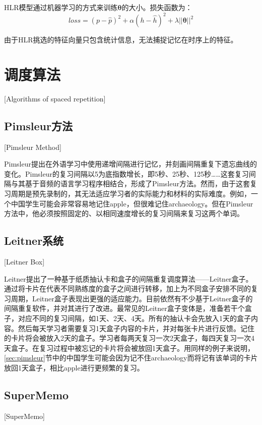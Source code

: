 HLR模型通过机器学习的方式来训练$\bm \theta$的大小。损失函数为：
\begin{equation}
\label{eqn:hlr:loss}
loss=(p-\hat p)^2 + \alpha(h-\hat h)^2 + \lambda||\bm\theta||^2
\end{equation}

由于HLR挑选的特征向量只包含统计信息，无法捕捉记忆在时序上的特征。

\section{调度算法}[Algorithms of spaced repetition]

\subsection{Pimsleur方法}[Pimsleur Method]\label{sec:pimsleur}

Pimsleur提出在外语学习中使用递增间隔进行记忆，并刻画间隔重复下遗忘曲线的变化\cite{pimsleurMemorySchedule1967}。Pimsleur的复习间隔以5为底指数增长，即5秒、25秒、125秒……这套复习间隔与其基于音频的语言学习程序相结合，形成了Pimsleur方法。然而，由于这套复习周期是预先录制的，其无法适应学习者的实际能力和材料的实际难度。例如，一个中国学生可能会非常容易地记住apple，但很难记住archaeology。但在Pimsleur方法中，他必须按照固定的、以相同速度增长的复习间隔来复习这两个单词。

\subsection{Leitner系统}[Leitner Box]

Leitner提出了一种基于纸质抽认卡和盒子的间隔重复调度算法——Leitner盒子\cite{leitnerLerntManLeben1974}。通过将卡片在代表不同熟练度的盒子之间进行转移，加上为不同盒子安排不同的复习周期，Leitner盒子表现出更强的适应能力。目前依然有不少基于Leitner盒子的间隔重复软件，并对其进行了改进。最常见的Leitner盒子变体是，准备若干个盒子，对应不同的复习间隔，如1天、2天、4天。所有的抽认卡会先放入1天的盒子内容。然后每天学习者需要复习1天盒子内容的卡片，并对每张卡片进行反馈。记住的卡片将会被放入2天的盒子。学习者每两天复习一次2天盒子，每四天复习一次4天盒子。在复习过程中被忘记的卡片将会被放回1天盒子。用同样的例子来说明，\ref{sec:pimsleur}节中的中国学生可能会因为记不住archaeology而将记有该单词的卡片放回1天盒子，相比apple进行更频繁的复习。

\subsection{SuperMemo}[SuperMemo]

